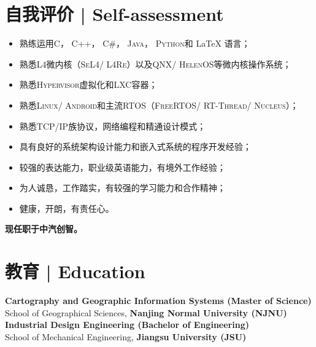 \documentclass{resume}
\begin{document}






 
\section{自我评价 | Self-assessment}
\begin{itemize}
  \setlength\itemsep{0.2ex}
  \item 熟练运用\textsc{C}， \textsc{C++}， \textsc{C\#}， \textsc{Java}， \textsc{Python}和 {\LaTeX} 语言；
  \item 熟悉\textsc{L4}微内核（\textsc{SeL4}/ \textsc{L4Re}）以及\textsc{QNX}/ \textsc{HelenOS}等微内核操作系统；
  \item 熟悉\textsc{Hypervisor}虚拟化和\textsc{LXC}容器；
  \item 熟悉\textsc{Linux}/ \textsc{Android}和主流\textsc{RTOS}（\textsc{FreeRTOS}/ \textsc{RT-Thread}/ \textsc{Nucleus}）；
  \item 熟悉\textsc{TCP}/\textsc{IP}族协议，网络编程和精通设计模式；
  \item 具有良好的系统架构设计能力和嵌入式系统的程序开发经验；
  \item 较强的表达能力，职业级英语能力，有境外工作经验；
  \item 为人诚恳，工作踏实，有较强的学习能力和合作精神；
  \item 健康，开朗，有责任心。
\end{itemize}
\hspace*{1.4em} \textbf{现任职于中汽创智。}
\spaceline{}

\section{教育 | Education}
\textbf{Cartography and Geographic Information Systems (Master of Science)}\\
School of Geographical Sciences, \textbf{Nanjing Normal University (NJNU)}
\textbf{Industrial Design Engineering (Bachelor of Engineering)}\\
School of Mechanical Engineering, \textbf{Jiangsu University (JSU)}
\spaceline{}
\end{document}
